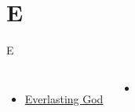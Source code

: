 \documentclass{beamer}
\begin{document}
\section{E}

\begin{frame}{E}
\begin{columns}
        \begin{itemize}
    \item \hyperlink{Everlasting God['Strength will rise']}{Everlasting God } \phantom{ 1 1 1 1 1 1 1 1 1 1}
\end{itemize}
        \begin{itemize}
            \item[] \phantom{1}\end{itemize}


\end{columns}

\end{frame}
\end{document}
